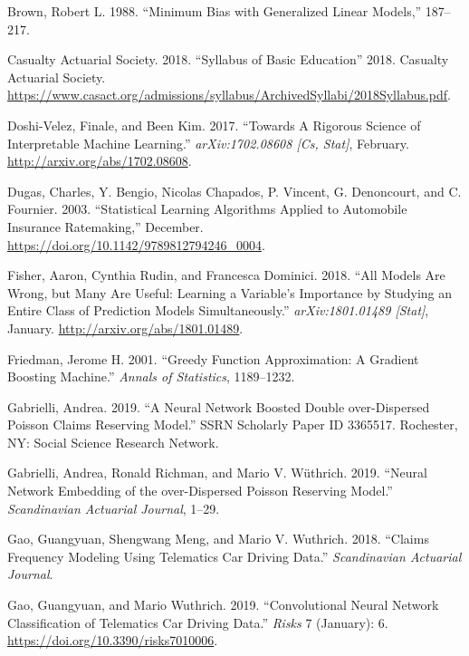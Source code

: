 \documentclass[preprint, 3p, twocolumn, letterpaper, 10pt]{elsarticle} %
\begin{document}
\leavevmode\hypertarget{ref-brown_1988}{}%
Brown, Robert L. 1988. ``Minimum Bias with Generalized Linear Models,'' 187--217.

\leavevmode\hypertarget{ref-cas_syllabus_2018}{}%
Casualty Actuarial Society. 2018. ``Syllabus of Basic Education'' 2018. Casualty Actuarial Society. \url{https://www.casact.org/admissions/syllabus/ArchivedSyllabi/2018Syllabus.pdf}.

\leavevmode\hypertarget{ref-doshi-velezRigorousScience2017}{}%
Doshi-Velez, Finale, and Been Kim. 2017. ``Towards A Rigorous Science of Interpretable Machine Learning.'' \emph{arXiv:1702.08608 {[}Cs, Stat{]}}, February. \url{http://arxiv.org/abs/1702.08608}.

\leavevmode\hypertarget{ref-dugas_2003}{}%
Dugas, Charles, Y. Bengio, Nicolas Chapados, P. Vincent, G. Denoncourt, and C. Fournier. 2003. ``Statistical Learning Algorithms Applied to Automobile Insurance Ratemaking,'' December. \url{https://doi.org/10.1142/9789812794246_0004}.

\leavevmode\hypertarget{ref-fisherAllModels2018}{}%
Fisher, Aaron, Cynthia Rudin, and Francesca Dominici. 2018. ``All Models Are Wrong, but Many Are Useful: Learning a Variable's Importance by Studying an Entire Class of Prediction Models Simultaneously.'' \emph{arXiv:1801.01489 {[}Stat{]}}, January. \url{http://arxiv.org/abs/1801.01489}.

\leavevmode\hypertarget{ref-friedmanGreedyFunction2001}{}%
Friedman, Jerome H. 2001. ``Greedy Function Approximation: A Gradient Boosting Machine.'' \emph{Annals of Statistics}, 1189--1232.

\leavevmode\hypertarget{ref-gabrielliNeuralNetwork2019}{}%
Gabrielli, Andrea. 2019. ``A Neural Network Boosted Double over-Dispersed Poisson Claims Reserving Model.'' SSRN Scholarly Paper ID 3365517. Rochester, NY: Social Science Research Network.

\leavevmode\hypertarget{ref-gabrielliNeuralNetwork2019a}{}%
Gabrielli, Andrea, Ronald Richman, and Mario V. Wüthrich. 2019. ``Neural Network Embedding of the over-Dispersed Poisson Reserving Model.'' \emph{Scandinavian Actuarial Journal}, 1--29.

\leavevmode\hypertarget{ref-gao_2018}{}%
Gao, Guangyuan, Shengwang Meng, and Mario V. Wuthrich. 2018. ``Claims Frequency Modeling Using Telematics Car Driving Data.'' \emph{Scandinavian Actuarial Journal}.

\leavevmode\hypertarget{ref-gao_2019}{}%
Gao, Guangyuan, and Mario Wuthrich. 2019. ``Convolutional Neural Network Classification of Telematics Car Driving Data.'' \emph{Risks} 7 (January): 6. \url{https://doi.org/10.3390/risks7010006}.
\end{document}
